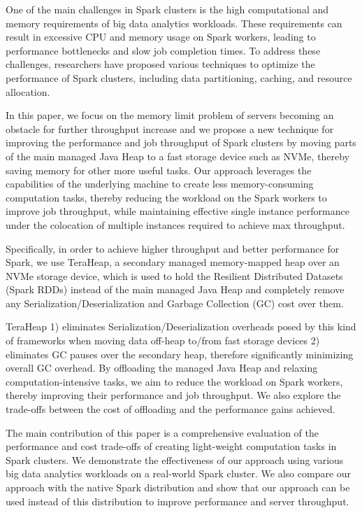 \documentclass[twocolumn,10pt]{asme2e}
\begin{document}
One of the main challenges in Spark clusters is the high computational and memory requirements of big data analytics workloads. These requirements can result in excessive CPU and memory usage on Spark workers, leading to performance bottlenecks and slow job completion times. To address these challenges, researchers have proposed various techniques to optimize the performance of Spark clusters, including data partitioning, caching, and resource allocation.

In this paper, we focus on the memory limit problem of servers becoming an obstacle for further throughput increase and we propose a new technique for improving the performance and job throughput of Spark clusters by moving parts of the main managed Java Heap to a fast storage device such as NVMe, thereby saving memory for other more useful tasks. Our approach leverages the capabilities of the underlying machine to create less memory-consuming computation tasks, thereby reducing the workload on the Spark workers to improve job throughput, while maintaining effective single instance performance under the colocation of multiple instances required to achieve max throughput.

Specifically, in order to achieve higher throughput and better performance for Spark, we use TeraHeap, a secondary managed memory-mapped heap over an NVMe storage device, which is used to hold the Resilient Distributed Datasets (Spark RDDs) instead of the main managed Java Heap and completely remove any Serialization/Deserialization and Garbage Collection (GC) cost over them.

TeraHeap 1) eliminates Serialization/Deserialization overheads posed by this kind of frameworks when moving data off-heap to/from fast storage devices 2) eliminates GC pauses over the secondary heap, therefore significantly minimizing overall GC overhead. By offloading the managed Java Heap and relaxing computation-intensive tasks, we aim to reduce the workload on Spark workers, thereby improving their performance and job throughput. We also explore the trade-offs between the cost of offloading and the performance gains achieved.

The main contribution of this paper is a comprehensive evaluation of the performance and cost trade-offs of creating light-weight computation tasks in Spark clusters. We demonstrate the effectiveness of our approach using various big data analytics workloads on a real-world Spark cluster. We also compare our approach with the native Spark distribution and show that our approach can be used instead of this distribution to improve performance and server throughput.
\end{document}
